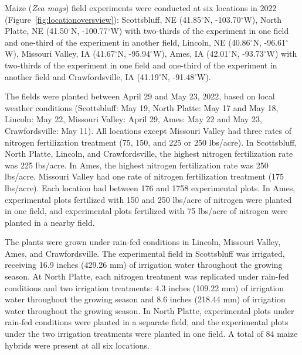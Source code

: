 \documentclass[12pt,twoside]{gsag3jnl}
\begin{document}
Maize (\textit{Zea mays}) field experiments were conducted at six locations in 2022 (Figure~\ref{fig:locationoversview}): Scottsbluff, NE (41.85$^{\circ}$N, -103.70$^{\circ}$W), North Platte, NE (41.50$^{\circ}$N, -100.77$^{\circ}$W) with two-thirds of the experiment in one field and one-third of the experiment in another field, Lincoln, NE (40.86$^{\circ}$N, -96.61$^{\circ}$W), Missouri Valley, IA (41.67$^{\circ}$N, -95.94$^{\circ}$W), Ames, IA (42.01$^{\circ}$N, -93.73$^{\circ}$W) with two-thirds of the experiment in one field and one-third of the experiment in another field and Crawfordsville, IA (41.19$^{\circ}$N, -91.48$^{\circ}$W).

The fields were planted between April 29 and May 23, 2022, based on local weather conditions (Scottsbluff: May 19, North Platte: May 17 and May 18, Lincoln: May 22, Missouri Valley: April 29, Ames: May 22 and May 23, Crawfordsville: May 11). All locations except Missouri Valley had three rates of nitrogen fertilization treatment (75, 150, and 225 or 250 lbs/acre). In Scottsbluff, North Platte, Lincoln, and Crawfordsville, the highest nitrogen fertilization rate was 225 lbs/acre. In Ames, the highest nitrogen fertilization rate was 250 lbs/acre. Missouri Valley had one rate of nitrogen fertilization treatment (175 lbs/acre). Each location had between 176 and 1758 experimental plots. In Ames, experimental plots fertilized with 150 and 250 lbs/acre of nitrogen were planted in one field, and experimental plots fertilized with 75 lbs/acre of nitrogen were planted in a nearby field.
 
 The plants were grown under rain-fed conditions in Lincoln, Missouri Valley, Ames, and Crawfordsville. The experimental field in Scottsbluff was irrigated, receiving 16.9 inches (429.26 mm) of irrigation water throughout the growing season. At North Platte, each nitrogen treatment was replicated under rain-fed conditions and two irrigation treatments: 4.3 inches (109.22 mm) of irrigation water throughout the growing season and 8.6 inches (218.44 mm) of irrigation water throughout the growing season. In North Platte, experimental plots under rain-fed conditions were planted in a separate field, and the experimental plots under the two irrigation treatments were planted in one field. A total of 84 maize hybrids were present at all six locations.
\end{document}
